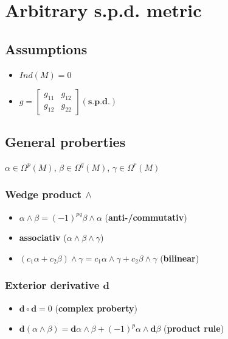\documentclass{scrartcl}
\newcommand{\exd}{\mathbf{d}}
\begin{document}
  \section{Arbitrary s.p.d. metric}
    \subsection{Assumptions}
      \begin{itemize}
        \item \( Ind(M) = 0 \)
        \item \( g =
      \begin{bmatrix}
        g_{11} & g_{12} \\
        g_{12} & g_{22}
      \end{bmatrix} (\textbf{s.p.d.}) \)
      \end{itemize}

    \subsection{General proberties}
      \( \alpha \in \Omega^{p}(M) \),  \( \beta \in \Omega^{q}(M) \),  \( \gamma \in \Omega^{r}(M) \)
      \subsubsection{Wedge product \( \wedge \)}
      \begin{itemize}
        \item \( \alpha\wedge\beta = (-1)^{pq}\beta\wedge\alpha \)
            (\textbf{anti-/commutativ})
        \item \textbf{associativ} (\( \alpha\wedge\beta\wedge\gamma \))
        \item \( \left( c_{1}\alpha + c_{2}\beta \right)\wedge\gamma
                  = c_{1}\alpha\wedge\gamma + c_{2}\beta\wedge\gamma\)
              (\textbf{bilinear})
      \end{itemize}

      \subsubsection{Exterior derivative \( \exd \)}
        \begin{itemize}
          \item \( \exd\circ\exd = 0 \) (\textbf{complex proberty})
          \item \( \exd\left( \alpha \wedge \beta \right) = \exd\alpha\wedge\beta + (-1)^{p}\alpha\wedge\exd\beta \)
                (\textbf{product rule})
        \end{itemize}
\end{document}
